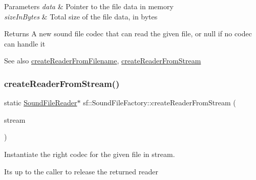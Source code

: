 \begin{DoxyParams}{Parameters}
{\em data} & Pointer to the file data in memory \\
\hline
{\em size\+In\+Bytes} & Total size of the file data, in bytes\\
\hline
\end{DoxyParams}
\begin{DoxyReturn}{Returns}
A new sound file codec that can read the given file, or null if no codec can handle it
\end{DoxyReturn}
\begin{DoxySeeAlso}{See also}
\hyperlink{classsf_1_1_sound_file_factory_af0a87110e0b8a77aada17b22a016c066}{create\+Reader\+From\+Filename}, \hyperlink{classsf_1_1_sound_file_factory_a8d4b1f225b72a128ddba3be22f7ba5a2}{create\+Reader\+From\+Stream} 
\end{DoxySeeAlso}
\mbox{\label{classsf_1_1_sound_file_factory_a8d4b1f225b72a128ddba3be22f7ba5a2}} 
\subsubsection{\texorpdfstring{create\+Reader\+From\+Stream()}{createReaderFromStream()}}
{\footnotesize\ttfamily static \hyperlink{classsf_1_1_sound_file_reader}{Sound\+File\+Reader}$\ast$ sf\+::\+Sound\+File\+Factory\+::create\+Reader\+From\+Stream (\begin{DoxyParamCaption}\item[{\hyperlink{classsf_1_1_input_stream}{Input\+Stream} \&}]{stream }\end{DoxyParamCaption})\hspace{0.3cm}{\ttfamily [static]}}



Instantiate the right codec for the given file in stream. 

It\textquotesingle{}s up to the caller to release the returned reader


